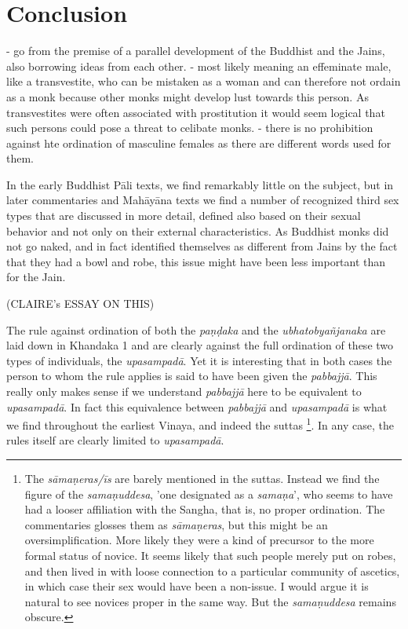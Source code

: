 \section{Conclusion}
- go from the premise of a parallel development of the Buddhist and the Jains, also borrowing ideas from each other.
- most likely meaning an effeminate male, like a transvestite, who can be mistaken as a woman and can therefore not ordain as a monk because other monks might develop lust towards this person. As transvestites were often associated with prostitution it would seem logical that such persons could pose a threat to celibate monks. 
- there is no prohibition against hte ordination of masculine females as there are different words used for them.

In the early Buddhist Pāli texts, we find remarkably little on the subject, but in later commentaries and Mahāyāna texts we find a number of recognized third sex types that are discussed in more detail, defined also based on their sexual behavior and not only on their external characteristics. As Buddhist monks did not go naked, and in fact identified themselves as different from Jains by the fact that they had a bowl and robe, this issue might have been less important than for the Jain.


(CLAIRE's ESSAY ON THIS)


The rule against ordination of both the {\em paṇḍaka } and the {\em ubhatob­yañ­janaka } are laid down in Khandaka 1 and are clearly against the full ordination of these two types of individuals, the {\em upasampadā}. Yet it is interesting that in both cases the person to whom the rule applies is said to have been given the {\em pabbajjā}. This really only makes sense if we understand {\em pabbajjā} here to be equivalent to {\em upasampadā}. In fact this equivalence between {\em pabbajjā} and {\em upasampadā} is what we find throughout the earliest Vinaya, and indeed the suttas \footnote{The {\em sāmaṇeras/īs} are barely mentioned in the suttas. Instead we find the figure of the {\em samaṇuddesa}, 'one designated as a {\em samaṇa}', who seems to have had a looser affiliation with the Sangha, that is, no proper ordination. The commentaries glosses them as {\em sāmaṇeras}, but this might be an oversimplification. More likely they were a kind of precursor to the more formal status of novice. It seems likely that such people merely put on robes, and then lived in with loose connection to a particular community of ascetics, in which case their sex would have been a non-issue. I would argue it is natural to see novices proper in the same way. But the {\em samaṇuddesa} remains obscure.}. In any case, the rules itself are clearly limited to {\em upasampadā}.


